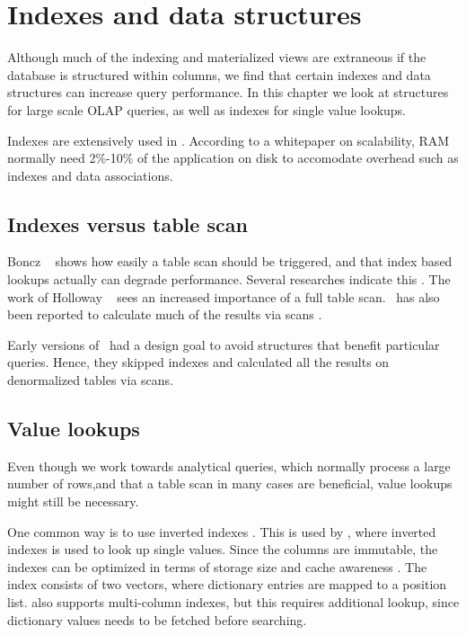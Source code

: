 \chapter{Indexes and data structures}
\label{chap:Indexes and data structures}
Although much of the indexing and materialized views are extraneous if the database is structured within columns, we find that certain indexes and data structures can increase query performance. In this chapter we look at structures for large scale OLAP queries, as well as indexes for single value lookups.

\newpage

Indexes are extensively used in \qlikview. According to a whitepaper on scalability, RAM normally need 2\%-10\% of the application on disk to accomodate overhead such as indexes and data associations.

\section{Indexes versus table scan}
\label{sec:Indexes versus table scan}
Boncz \ea~\cite{Boncz2006-md} shows how easily a table scan should be triggered, and that index based lookups actually can degrade performance. Several researches indicate this \cite{Boncz2002-yj, Abadi2008-dd}. The work of Holloway \ea~\cite{Holloway2008-rr} sees an increased importance of a full table scan. \qlikview~has also been reported to calculate much of the results via scans \cite{noauthor_undated-js}.

Early versions of \blink~had a design goal to avoid structures that benefit particular queries. Hence, they skipped indexes and calculated all the results on denormalized tables via scans.

\section{Value lookups}
\label{sec:Single value lookups}
Even though we work towards analytical queries, which normally process a large number of rows,and that a table scan in many cases are beneficial, value lookups might still be necessary.

One common way is to use inverted indexes \cite{Lemke2010-is}. This is used by \hyrise, where inverted indexes is used to look up single values. Since the columns are immutable, the indexes can be optimized in terms of storage size and cache awareness \cite{Schwalb2014-hn}. The index consists of two vectors, where dictionary entries are mapped to a position list.  \hyrise also supports multi-column indexes, but this requires additional lookup, since dictionary values needs to be fetched before searching.


